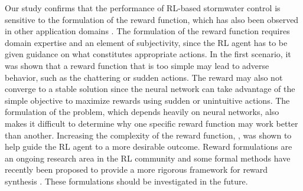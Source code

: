 Our study confirms that the performance of RL-based stormwater control is sensitive to the formulation of the reward function, which has also been observed in other application domains \cite{ng1999policy}.
The formulation of the reward function requires domain expertise and an element of subjectivity, since the RL agent has to be given guidance on what constitutes appropriate actions.
In the first scenario, it was shown that a reward function that is too simple may lead to adverse behavior, such as the chattering or sudden actions.
The reward may also not converge to a stable solution since the neural network can take advantage of the simple objective to maximize rewards using sudden or unintuitive actions.
The formulation of the problem, which depends heavily on neural networks, also makes it difficult to determine why one specific reward function may work better than another.
Increasing the complexity of the reward function, , was shown to help guide the RL agent to a more desirable outcome. 
Reward formulations are an ongoing research area in the RL community and some formal methods have recently been proposed to provide a more rigorous framework for reward synthesis \cite{fu2017learning}. These formulations should be investigated in the future.


